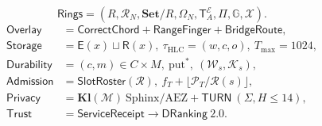 \documentclass[journal]{IEEEtran}
\begin{document}
\[
  \mathsf{Rings}=
  (R,\mathcal{R}_N,\mathbf{Set}/R,\Omega_N,
   \mathsf{T}^{\mathcal{E}}_A,\Pi,\mathbb{G},\mathcal{X}).
\]
\[
\begin{aligned}
\mathsf{Overlay} &= \mathsf{CorrectChord}+\mathsf{RangeFinger}+\mathsf{BridgeRoute},\\
\mathsf{Storage} &= \mathsf{E}(x)\sqcup\mathsf{R}(x),\ \tau_{\mathrm{HLC}}=(w,c,o),\ T_{\max}=1024,\\
\mathsf{Durability} &= (c,m)\in C\times M,\ \mathrm{put}^*,\ (\mathcal{W}_s,\mathcal{K}_s),\\
\mathsf{Admission} &= \mathsf{SlotRoster}(\mathcal{R}),\ f_T+\lfloor\mathcal{P}_T/\mathcal{R}(s)\rfloor,\\
\mathsf{Privacy} &= \mathbf{Kl}(\mathcal{M})\ \text{Sphinx/AEZ}+\mathsf{TURN}\ (\Sigma,H\le 14),\\
\mathsf{Trust} &= \mathsf{ServiceReceipt}\to\mathsf{DRanking\ 2.0}.
\end{aligned}
\]



\end{document}
